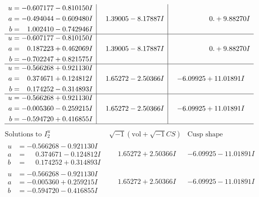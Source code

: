 \documentclass[1p]{elsarticle_modified}
\theoremstyle{definition}
\newcommand{\I}{\sqrt{-1}}
\begin{document}
$$\begin{array}{c|c|c}
\begin{aligned}
u &= -0.607177 - 0.810150 I \\
a &= -0.494044 - 0.609480 I \\
b &= \phantom{-}1.002410 - 0.742946 I\end{aligned}
 & \phantom{-}1.39005 - 8.17887 I & \phantom{-0.000000 -}0. + 9.88270 I \\ \hline\begin{aligned}
u &= -0.607177 - 0.810150 I \\
a &= \phantom{-}0.187223 + 0.462069 I \\
b &= -0.702247 + 0.821575 I\end{aligned}
 & \phantom{-}1.39005 - 8.17887 I & \phantom{-0.000000 -}0. + 9.88270 I \\ \hline\begin{aligned}
u &= -0.566268 + 0.921130 I \\
a &= \phantom{-}0.374671 + 0.124812 I \\
b &= \phantom{-}0.174252 - 0.314893 I\end{aligned}
 & \phantom{-}1.65272 - 2.50366 I & -6.09925 + 11.01891 I \\ \hline\begin{aligned}
u &= -0.566268 + 0.921130 I \\
a &= -0.005360 - 0.259215 I \\
b &= -0.594720 + 0.416855 I\end{aligned}
 & \phantom{-}1.65272 - 2.50366 I & -6.09925 + 11.01891 I\\
 \hline 
 \end{array}$$\newpage$$\begin{array}{c|c|c}  
\text{Solutions to }I^u_{2}& \I (\text{vol} + \sqrt{-1}CS) & \text{Cusp shape}\\
 \hline 
\begin{aligned}
u &= -0.566268 - 0.921130 I \\
a &= \phantom{-}0.374671 - 0.124812 I \\
b &= \phantom{-}0.174252 + 0.314893 I\end{aligned}
 & \phantom{-}1.65272 + 2.50366 I & -6.09925 - 11.01891 I \\ \hline\begin{aligned}
u &= -0.566268 - 0.921130 I \\
a &= -0.005360 + 0.259215 I \\
b &= -0.594720 - 0.416855 I\end{aligned}
 & \phantom{-}1.65272 + 2.50366 I & -6.09925 - 11.01891 I \\ \hline\begin{aligned}

\end{aligned}
\end{array}$$
\end{document}

